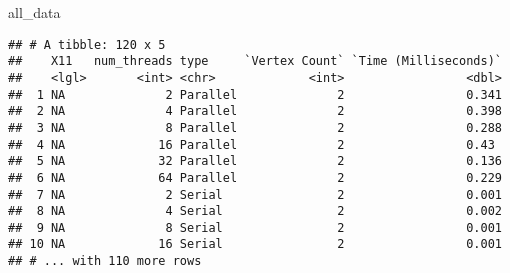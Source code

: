 \documentclass[]{article}
\newenvironment{Shaded}{\begin{snugshade}}{\end{snugshade}}
\newcommand{\KeywordTok}[1]{\textcolor[rgb]{0.13,0.29,0.53}{\textbf{#1}}}
\newcommand{\DataTypeTok}[1]{\textcolor[rgb]{0.13,0.29,0.53}{#1}}
\newcommand{\StringTok}[1]{\textcolor[rgb]{0.31,0.60,0.02}{#1}}
\newcommand{\OperatorTok}[1]{\textcolor[rgb]{0.81,0.36,0.00}{\textbf{#1}}}
\newcommand{\NormalTok}[1]{#1}
\begin{document}
\begin{Shaded}
\end{Shaded}

\begin{Shaded}
\begin{Highlighting}[]
\NormalTok{all_data}
\end{Highlighting}
\end{Shaded}

\begin{verbatim}
## # A tibble: 120 x 5
##    X11   num_threads type     `Vertex Count` `Time (Milliseconds)`
##    <lgl>       <int> <chr>             <int>                 <dbl>
##  1 NA              2 Parallel              2                 0.341
##  2 NA              4 Parallel              2                 0.398
##  3 NA              8 Parallel              2                 0.288
##  4 NA             16 Parallel              2                 0.43 
##  5 NA             32 Parallel              2                 0.136
##  6 NA             64 Parallel              2                 0.229
##  7 NA              2 Serial                2                 0.001
##  8 NA              4 Serial                2                 0.002
##  9 NA              8 Serial                2                 0.001
## 10 NA             16 Serial                2                 0.001
## # ... with 110 more rows
\end{verbatim}
\end{document}
